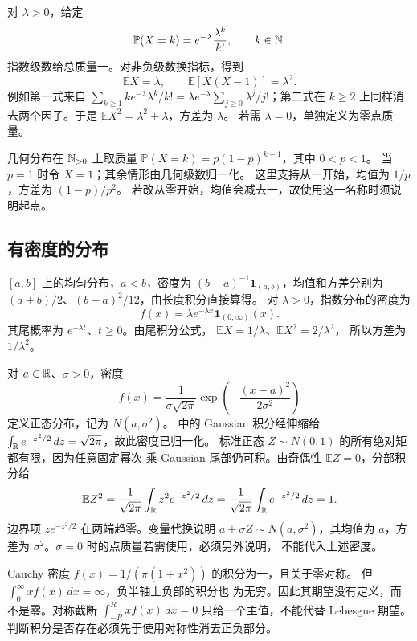 \begin{example}[Poisson 分布]
对 \(\lambda>0\)，给定
\[
 \mathbb P(X=k)=e^{-\lambda}\frac{\lambda^k}{k!},\qquad k\in\mathbb{N}.
\]
指数级数给总质量一。对非负级数换指标，得到
\[
 \mathbb E X=\lambda,\qquad
 \mathbb E[X(X-1)]=\lambda^2.
\]
例如第一式来自
\(\sum_{k\ge1}ke^{-\lambda}\lambda^k/k!
 =\lambda e^{-\lambda}\sum_{j\ge0}\lambda^j/j!\)；第二式在
\(k\ge2\) 上同样消去两个因子。于是
\(\mathbb E X^2=\lambda^2+\lambda\)，方差为 \(\lambda\)。
若需 \(\lambda=0\)，单独定义为零点质量。
\end{example}

几何分布在 \(\mathbb{N}_{>0}\) 上取质量
\(\mathbb P(X=k)=p(1-p)^{k-1}\)，其中 \(0<p<1\)。
当 \(p=1\) 时令 \(X=1\)；其余情形由几何级数归一化。
这里支持从一开始，均值为 \(1/p\)，方差为 \((1-p)/p^2\)。
若改从零开始，均值会减去一，故使用这一名称时须说明起点。

\subsection{有密度的分布}

\([a,b]\) 上的均匀分布，\(a<b\)，密度为
\((b-a)^{-1}\mathbf1_{(a,b)}\)，均值和方差分别为
\((a+b)/2\)、\((b-a)^2/12\)，由长度积分直接算得。
对 \(\lambda>0\)，指数分布的密度为
\[
 f(x)=\lambda e^{-\lambda x}\mathbf1_{(0,\infty)}(x).
\]
其尾概率为 \(e^{-\lambda t}\)、\(t\ge0\)。由尾积分公式，
\(\mathbb E X=1/\lambda\)、\(\mathbb E X^2=2/\lambda^2\)，
所以方差为 \(1/\lambda^2\)。

\begin{example}[正态分布]
对 \(a\in\mathbb{R}\)、\(\sigma>0\)，密度
\[
 f(x)=\frac1{\sigma\sqrt{2\pi}}
       \exp\left(-\frac{(x-a)^2}{2\sigma^2}\right)
\]
定义正态分布，记为 \(N(a,\sigma^2)\)。
中的 Gaussian 积分经伸缩给
\(\int_{\mathbb{R}} e^{-z^2/2}\,dz=\sqrt{2\pi}\)，故此密度已归一化。
标准正态 \(Z\sim N(0,1)\) 的所有绝对矩都有限，因为任意固定幂次
乘 Gaussian 尾部仍可积。由奇偶性 \(\mathbb E Z=0\)，分部积分给
\[
 \mathbb E Z^2
 =\frac1{\sqrt{2\pi}}\int_{\mathbb{R}} z^2e^{-z^2/2}\,dz
 =\frac1{\sqrt{2\pi}}\int_{\mathbb{R}} e^{-z^2/2}\,dz=1.
\]
边界项 \(ze^{-z^2/2}\) 在两端趋零。变量代换说明
\(a+\sigma Z\sim N(a,\sigma^2)\)，其均值为 \(a\)，方差为
\(\sigma^2\)。\(\sigma=0\) 时的点质量若需使用，必须另外说明，
不能代入上述密度。
\end{example}

\begin{counterexample}[对称分布的期望可能没有定义]
Cauchy 密度 \(f(x)=1/(\pi(1+x^2))\) 的积分为一，且关于零对称。
但 \(\int_0^\infty xf(x)\,dx=\infty\)，负半轴上负部的积分也
为无穷。因此其期望没有定义，而不是零。对称截断
\(\int_{-R}^Rxf(x)\,dx=0\) 只给一个主值，不能代替 Lebesgue
期望。判断积分是否存在必须先于使用对称性消去正负部分。
\end{counterexample}

